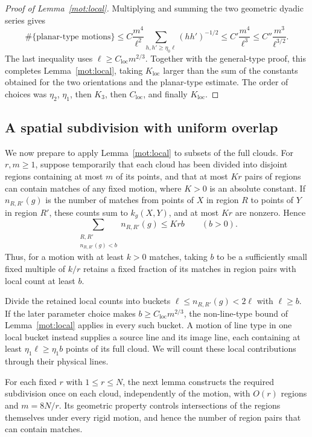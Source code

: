 \begin{proof}[Proof of Lemma~\ref{mot:local}]
Multiplying and summing the two geometric dyadic series gives
\[
 \#\{\text{planar-type motions}\}
 \le C\frac{m^4}{\ell^2}
      \sum_{h,h'\ge\eta_0\ell}(hh')^{-1/2}
 \le C'\frac{m^4}{\ell^3}
 \le C''\frac{m^3}{\ell^{3/2}}.
\]
The last inequality uses \(\ell\ge C_{\mathrm{loc}}m^{2/3}\).
Together with the general-type proof, this completes
Lemma~\ref{mot:local}, taking \(K_{\mathrm{loc}}\) larger than
the sum of the constants obtained for the two orientations and
the planar-type estimate.  The order of choices was
\(\eta_2\), \(\eta_1\), then \(K_3\), then
\(C_{\mathrm{loc}}\), and finally \(K_{\mathrm{loc}}\).
\end{proof}

\subsection{A spatial subdivision with uniform overlap}

We now prepare to apply Lemma~\ref{mot:local} to subsets of the full
clouds.  For \(r,m\ge1\), suppose temporarily that each cloud has been
divided into disjoint regions containing at most \(m\) of its points, and that at
most \(Kr\) pairs of regions can contain matches of any fixed motion,
where \(K>0\) is an absolute constant.  If \(n_{R,R'}(g)\) is the
number of matches from points of \(X\) in region \(R\) to points of
\(Y\) in region \(R'\), these counts sum to \(k_g(X,Y)\), and at most
\(Kr\) are nonzero.  Hence
\begin{equation}
\label{mot:region-discard}
 \sum_{\substack{R,R'\\ n_{R,R'}(g)<b}} n_{R,R'}(g)\le Krb
 \qquad(b>0).
\end{equation}
Thus, for a motion with at least \(k>0\) matches, taking \(b\) to be a
sufficiently small fixed multiple of \(k/r\) retains a fixed fraction
of its matches in region pairs with local count at least \(b\).

Divide the retained local counts into buckets
\(\ell\le n_{R,R'}(g)<2\ell\) with \(\ell\ge b\).  If the later
parameter choice makes
\(b\ge C_{\mathrm{loc}}m^{2/3}\), the non-line-type bound of
Lemma~\ref{mot:local} applies in every such bucket.  A motion of line
type in one local bucket instead supplies a source line and its image
line, each containing at least \(\eta_1\ell\ge\eta_1b\) points of its
full cloud.  We will count these local contributions through their
physical lines.

For each fixed \(r\) with \(1\le r\le N\), the next lemma constructs
the required subdivision once on each cloud, independently of the motion,
with \(O(r)\) regions and \(m=8N/r\).
Its geometric property controls intersections of the regions themselves
under every rigid motion, and hence the number of region pairs that can
contain matches.

